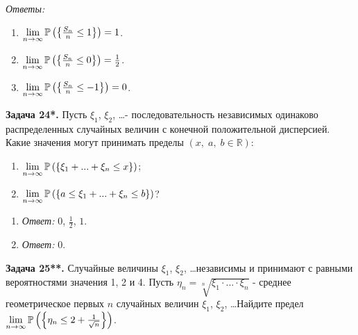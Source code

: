\textit{Ответы:}

\begin{enumerate}
\item  $\mathop{\lim }\limits_{n\to \infty } {\rm {\mathbb P}}\left(\left\{\frac{S_{n} }{n} \le 1\right\}\right)=1$.

\item  $\mathop{\lim }\limits_{n\to \infty } {\rm {\mathbb P}}\left(\left\{\frac{S_{n} }{n} \le 0\right\}\right)={\tfrac{1}{2}} $.

\item  $\mathop{\lim }\limits_{n\to \infty } {\rm {\mathbb P}}\left(\left\{\frac{S_{n} }{n} \le -1\right\}\right)=0$.
\end{enumerate}



\textbf{Задача 24*. }Пусть $\xi _{1} $, $\xi _{2} $, \dots  - последовательность независимых одинаково распределенных случайных величин с конечной положительной дисперсией. Какие значения могут принимать пределы $\left(x,\; a,\; b\in {\mathbb R}\right)$: 

\begin{enumerate}
\item \textbf{ }$\mathop{\lim }\limits_{n\to \infty } {\rm {\mathbb P}}\left(\left\{\xi _{1} +...+\xi _{n} \le x\right\}\right)$;

\item  $\mathop{\lim }\limits_{n\to \infty } {\rm {\mathbb P}}\left(\left\{a\le \xi _{1} +...+\xi _{n} \le b\right\}\right)$?
\end{enumerate}



\begin{enumerate}
\item  \textit{Ответ:}\textbf{\textit{ }}$0$, ${\tfrac{1}{2}} $, $1$.

\item  \textit{Ответ:}\textbf{\textit{ }}$0$.
\end{enumerate}



\textbf{Задача 25**. }Случайные величины $\xi _{1} $, $\xi _{2} $, \dots  независимы и принимают с равными вероятностями значения 1, 2 и 4. Пусть $\eta _{n} =\sqrt[{n}]{\xi _{1} \cdot ...\cdot \xi _{n} } $ - среднее геометрическое первых $n$ случайных величин $\xi _{1} $, $\xi _{2} $, \dots  Найдите предел $\mathop{\lim }\limits_{n\to \infty } {\rm {\mathbb P}}\left(\left\{\eta _{n} \le 2+{\tfrac{1}{\sqrt{n} }} \right\}\right)$. 

